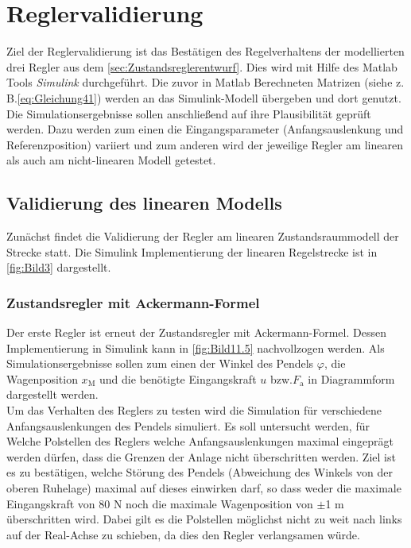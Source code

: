 \documentclass[
	pagesize,
	fontsize=12pt,
	paper=a4,
	oneside,
   reqno
]{scrartcl}
\newcommand{\bzw}{bzw.\xspace}
\newcommand{\zB}{z.\,B.\xspace}
\begin{document}
\clearpage

\section{Reglervalidierung}

Ziel der Reglervalidierung ist das Bestätigen des Regelverhaltens der modellierten drei Regler aus dem \autoref{sec:Zustandsreglerentwurf}. Dies wird mit Hilfe des Matlab Tools \textit{Simulink} durchgeführt. Die zuvor in Matlab Berechneten Matrizen (siehe \zB \autoref{eq:Gleichung41}) werden an das Simulink-Modell übergeben und dort genutzt. Die Simulationsergebnisse sollen anschließend auf ihre Plausibilität geprüft werden. Dazu werden zum einen die Eingangsparameter (Anfangsauslenkung und Referenzposition) variiert und zum anderen wird der jeweilige Regler am linearen als auch am nicht-linearen Modell getestet.

\subsection{Validierung des linearen Modells}

Zunächst findet die Validierung der Regler am linearen Zustandsraummodell der Strecke statt. Die Simulink Implementierung der linearen Regelstrecke ist in \autoref{fig:Bild3} dargestellt.

\subsubsection{Zustandsregler mit Ackermann-Formel} \label{sec:val-acker}

Der erste Regler ist erneut der Zustandsregler mit Ackermann-Formel. Dessen Implementierung in Simulink kann in \autoref{fig:Bild11.5} nachvollzogen werden. Als Simulationsergebnisse sollen zum einen der Winkel des Pendels $\varphi$, die Wagenposition $x_{\mathrm{M}}$ und die benötigte Eingangskraft $u$ \bzw $F_{\mathrm{a}}$ in Diagrammform dargestellt werden. \\
Um das Verhalten des Reglers zu testen wird die Simulation für verschiedene Anfangsauslenkungen des Pendels simuliert. Es soll untersucht werden, für Welche Polstellen des Reglers welche Anfangsauslenkungen maximal eingeprägt werden dürfen, dass die Grenzen der Anlage nicht überschritten werden. Ziel ist es zu bestätigen, welche Störung des Pendels (Abweichung des Winkels von der oberen Ruhelage) maximal auf dieses einwirken darf, so dass weder die maximale Eingangskraft von 80 N noch die maximale Wagenposition von $\pm$1 m überschritten wird. Dabei gilt es die Polstellen möglichst nicht zu weit nach links auf der Real-Achse zu schieben, da dies den Regler verlangsamen würde.
\end{document}
